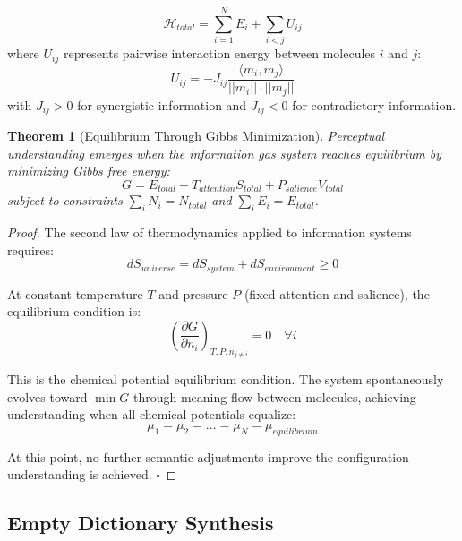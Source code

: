 \documentclass[12pt]{article}
\newtheorem{theorem}{Theorem}[section]
\theoremstyle{definition}
\theoremstyle{remark}
\begin{document}
\begin{equation}
\label{eq:total_hamiltonian}
\mathcal{H}_{total} = \sum_{i=1}^{N} E_i + \sum_{i<j} U_{ij}
\end{equation}
where $U_{ij}$ represents pairwise interaction energy between molecules $i$ and $j$:
\begin{equation}
U_{ij} = -J_{ij} \frac{\langle m_i, m_j \rangle}{||m_i|| \cdot ||m_j||}
\end{equation}
with $J_{ij} > 0$ for synergistic information and $J_{ij} < 0$ for contradictory information.

\begin{theorem}[Equilibrium Through Gibbs Minimization]
\label{thm:gibbs_minimization}
Perceptual understanding emerges when the information gas system reaches equilibrium by minimizing Gibbs free energy:
\begin{equation}
\label{eq:gibbs_free_energy}
G = E_{total} - T_{attention} S_{total} + P_{salience} V_{total}
\end{equation}
subject to constraints $\sum_i N_i = N_{total}$ and $\sum_i E_i = E_{total}$.
\end{theorem}

\begin{proof}
The second law of thermodynamics applied to information systems requires:
\begin{equation}
dS_{universe} = dS_{system} + dS_{environment} \geq 0
\end{equation}

At constant temperature $T$ and pressure $P$ (fixed attention and salience), the equilibrium condition is:
\begin{equation}
\left(\frac{\partial G}{\partial n_i}\right)_{T,P,n_{j \neq i}} = 0 \quad \forall i
\end{equation}

This is the chemical potential equilibrium condition. The system spontaneously evolves toward $\min G$ through meaning flow between molecules, achieving understanding when all chemical potentials equalize:
\begin{equation}
\mu_1 = \mu_2 = ... = \mu_N = \mu_{equilibrium}
\end{equation}

At this point, no further semantic adjustments improve the configuration—understanding is achieved. $\square$
\end{proof}

\subsection{Empty Dictionary Synthesis}
\end{document}
